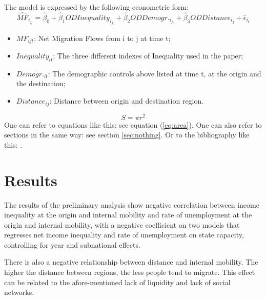 \documentclass{article}
\theoremstyle{definition}
\theoremstyle{remark}
\begin{document}
\vspace{5mm} 
The model is expressed by the following econometric form:
\vspace{5mm}  
\begin{equation}
 \hat{MF}_i_j_t = \hat{\beta}_0 + \hat{\beta}_1 ODInequality_i_j_t + \hat{\beta}_2 ODDemogr._i_j_t +
 \hat{\beta}_3 ODDistance_i_j+ \hat{\epsilon}_i_t
   \end{equation}
   \vspace{5mm} 
 \begin{itemize}
  \item {$MF_{ijt}$: Net Migration Flows from i to j at time t;}
  \item {$Inequality_{it}$: The three different indexes of Inequality used in the paper;}
  \item {$Demogr._{it}$: The demographic controls above listed at time t, at the origin and the destination;}
  \item {$Distance_{ij}$: Distance between origin and destination region.}
    \end{itemize}



 








\begin{equation}\label{eq:area}
  S = \pi r^2
\end{equation}
One can refer to equations like this: see equation (\ref{eq:area}). One can also
refer to sections in the same way: see section \ref{sec:nothing}. Or
to the bibliography like this: \cite{Cd94}.

\section{Results}
The results of the preliminary analysis show negative correlation between income inequality at the origin and internal mobility and rate of unemployment at the origin and internal mobility, with a negative coefficient on two models that regresses net income inequality and rate of unemployment on state capacity, controlling for year and subnational effects. 

There is also a negative relationship between distance and internal mobility. The higher the distance between regions, the less people tend to migrate. This effect can be related to the afore-mentioned lack of liquidity and lack of social networks.
\end{document}
